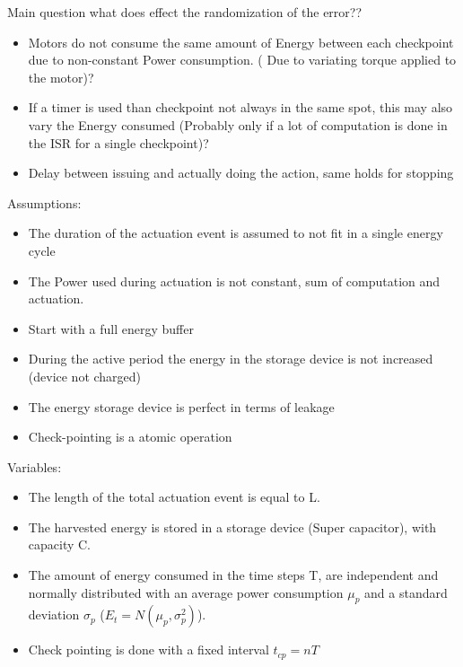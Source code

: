 \documentclass[11pt,twoside,a4paper]{article}
\begin{document}
Main question what does effect the randomization of the error??
	
\begin{itemize}
\item Motors do not consume the same amount of Energy between each checkpoint due to non-constant Power consumption. ( Due to variating torque applied to the motor)?
\item If a timer is used than checkpoint not always in the same spot, this may also vary the Energy consumed (Probably only if a lot of computation is done in the ISR for a single checkpoint)?
\item Delay between issuing and actually doing the action, same holds for stopping
\end{itemize}


Assumptions: \ 
\begin{itemize}
\item The duration of the actuation event is assumed to not fit in a single energy cycle
\item The Power used during actuation is not constant, sum of computation and actuation.
\item Start with a full energy buffer
\item During the active period the energy in the storage device is not increased (device not charged)
\item The energy storage device is perfect in terms of leakage
\item Check-pointing is a atomic operation
%

\end{itemize}


Variables: \
\begin{itemize}
\item The length of the total actuation event is equal to L.
\item The harvested energy is stored in a storage device (Super capacitor), with capacity C.
\item The amount of energy consumed in the time steps T, are independent and normally distributed with an average power consumption $\mu_p$ and a standard deviation $\sigma_p$ ($E_t = N(\mu_p,\sigma_p^2)$).
\item Check pointing is done with a fixed interval $t_{cp} = nT$
\end{itemize}
\end{document}
